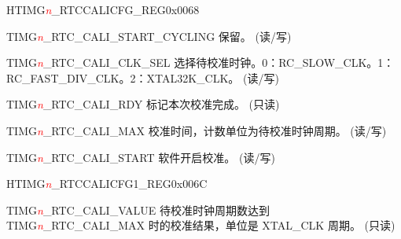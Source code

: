 \begin{register}{H}{TIMG\textcolor{red}{\it{n}}\_RTCCALICFG\_REG}{0x0068}\label{regdesc:TIMGRTCCALICFGREG}
%
%
%
%
%
%
\regnewline%
\begin{regdesc}\begin{reglist}
\label{fielddesc:TIMGRTCCALISTARTCYCLING}\item [TIMG\textcolor{red}{\it{n}}\_RTC\_CALI\_START\_CYCLING] 保留。 (读/写)
\label{fielddesc:TIMGRTCCALICLKSEL}\item [TIMG\textcolor{red}{\it{n}}\_RTC\_CALI\_CLK\_SEL] 选择待校准时钟。0：RC\_SLOW\_CLK。1：RC\_FAST\_DIV\_CLK。2：XTAL32K\_CLK。 (读/写)
\label{fielddesc:TIMGRTCCALIRDY}\item [TIMG\textcolor{red}{\it{n}}\_RTC\_CALI\_RDY] 标记本次校准完成。 (只读)
\label{fielddesc:TIMGRTCCALIMAX}\item [TIMG\textcolor{red}{\it{n}}\_RTC\_CALI\_MAX] 校准时间，计数单位为待校准时钟周期。 (读/写)
\label{fielddesc:TIMGRTCCALISTART}\item [TIMG\textcolor{red}{\it{n}}\_RTC\_CALI\_START] 软件开启校准。 (读/写)
\end{reglist}\end{regdesc}
\end{register}


\begin{register}{H}{TIMG\textcolor{red}{\it{n}}\_RTCCALICFG1\_REG}{0x006C}\label{regdesc:TIMGRTCCALICFG1REG}
%
%
\regnewline%
\begin{regdesc}\begin{reglist}
\label{fielddesc:TIMGRTCCALIVALUE}\item [TIMG\textcolor{red}{\it{n}}\_RTC\_CALI\_VALUE] 待校准时钟周期数达到 TIMG\textcolor{red}{\it{n}}\_RTC\_CALI\_MAX 时的校准结果，单位是 XTAL\_CLK 周期。 (只读)
\end{reglist}\end{regdesc}
\end{register}

